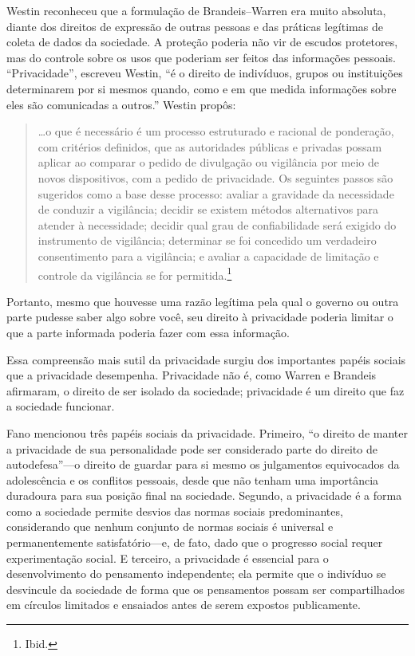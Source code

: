 \documentclass{book}
\begin{document}
Westin reconheceu que a formulação de Brandeis--Warren era muito absoluta, diante
dos direitos de expressão de outras pessoas e das práticas legítimas de coleta
de dados da sociedade. A proteção poderia não vir de escudos protetores, mas
do controle sobre os usos que poderiam ser feitos das informações pessoais.
``Privacidade'', escreveu Westin, ``é o direito de indivíduos, grupos ou instituições
determinarem por si mesmos quando, como e em que medida informações sobre eles
são comunicadas a outros.'' Westin propôs:

\begin{quote}
\ldots o que é necessário é um processo estruturado e racional de ponderação,
com critérios definidos, que as autoridades públicas e privadas possam aplicar
ao comparar o pedido de divulgação ou vigilância por meio de novos
dispositivos, com a pedido de privacidade. Os seguintes passos são
sugeridos como a base desse processo: avaliar a gravidade da necessidade de
conduzir a vigilância; decidir se existem métodos alternativos para atender
à necessidade; decidir qual grau de confiabilidade será exigido do instrumento
de vigilância; determinar se foi concedido um verdadeiro consentimento para a
vigilância; e avaliar a capacidade de limitação e controle da vigilância se
for permitida.\footnote{Ibid.}  
\end{quote}

Portanto, mesmo que houvesse uma razão legítima pela qual o governo ou outra
parte pudesse saber algo sobre você, seu direito à privacidade poderia limitar
o que a parte informada poderia fazer com essa informação.

Essa compreensão mais sutil da privacidade surgiu dos importantes papéis sociais
que a privacidade desempenha. Privacidade não é, como Warren e Brandeis afirmaram,
o direito de ser isolado da sociedade; privacidade é um direito que faz a
sociedade funcionar.

Fano mencionou três papéis sociais da privacidade. Primeiro, ``o direito de manter
a privacidade de sua personalidade pode ser considerado parte do direito de
autodefesa''---o direito de guardar para si mesmo os julgamentos equivocados da
adolescência e os conflitos pessoais, desde que não tenham uma importância
duradoura para sua posição final na sociedade. Segundo, a privacidade é a forma
como a sociedade permite desvios das normas sociais predominantes, considerando
que nenhum conjunto de normas sociais é universal e permanentemente satisfatório---e, 
de fato, dado que o progresso social requer experimentação social. E terceiro,
a privacidade é essencial para o desenvolvimento do pensamento independente; ela
permite que o indivíduo se desvincule da sociedade de forma que os pensamentos
possam ser compartilhados em círculos limitados e ensaiados antes de serem
expostos publicamente.
\end{document}
